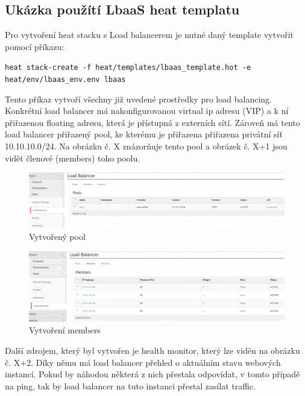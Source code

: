 \subsection{Ukázka použítí LbaaS heat templatu}

Pro vytvoření heat stacku s Load balancerem je nutné daný template vytvořit pomocí příkazu:

\verb!heat stack-create -f heat/templates/lbaas_template.hot -e heat/env/lbaas_env.env lbaas!

Tento příkaz vytvoří všechny již uvedené prostředky pro load balancing. Konkrétní load balancer má nakonfigurovanou virtual ip adresu (VIP) a k ní přiřazenou floating adresu, která je přístupná z externích sítí. Zároveň má tento load balancer přiřazený pool, ke kterému je přiřazena přiřazena privátní síť 10.10.10.0/24. Na obrázku č. X znázorňuje tento pool a obrázek č. X+1 jsou vidět členové (members) toho poolu.

\begin{figure}[h]
\begin{centering}
\includegraphics[scale=0.45]{images/lbaas1}
\par\end{centering}
\caption{Vytvořený pool\label{fig:lbaas1}}
\end{figure}

\begin{figure}[h]
\begin{centering}
\includegraphics[scale=0.45]{images/lbaas2}
\par\end{centering}
\caption{Vytvoření members\label{fig:lbaas2}}
\end{figure}

Další zdrojem, který byl vytvořen je health monitor, který lze viděn na obrázku č. X+2. Díky němu má load balancer přehled o aktuálním stavu webových instancí. Pokud by náhodou některá z nich přestala odpovídat, v tomto případě na ping, tak by load balancer na tuto instanci přestal zasílat traffic.

